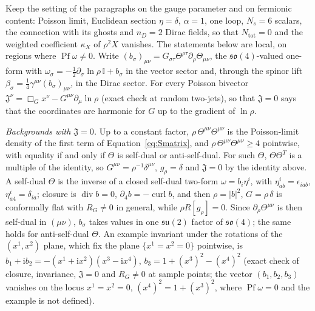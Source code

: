 Keep the setting of the paragraphs on the gauge parameter and on fermionic content: Poisson limit, Euclidean section \(\eta=\delta\), \(\alpha=1\), one loop, \(N_s=6\) scalars, the connection with its ghosts and \(n_D=2\) Dirac fields, so that \(N_{\mathrm{tot}}=0\) and the weighted coefficient \(\kappa_X\) of \(\rho^2X\) vanishes. The statements below are local, on regions where \(\operatorname{Pf}\omega\ne0\). Write \((b_\sigma)_{\mu\nu}=G_{\sigma\tau}\Theta^{\rho\tau}\partial_\rho\Theta_{\mu\nu}\), the \(\mathfrak{so}(4)\)-valued one-form with \(\omega_\sigma=-\tfrac12\partial_\sigma\ln\rho\,\mathbb I+b_\sigma\) in the vector sector and, through the spinor lift \(\beta_\sigma=\tfrac14\gamma^{\mu\nu}(b_\sigma)_{\mu\nu}\), in the Dirac sector. For every Poisson bivector \(\mathfrak J^\nu=\Box_Gx^\nu-G^{\mu\nu}\partial_\mu\ln\rho\) (exact check at random two-jets), so that \(\mathfrak J=0\) says that the coordinates are harmonic for \(G\) up to the gradient of \(\ln\rho\).



\emph{Backgrounds with \(\mathfrak J=0\).} Up to a constant factor, \(\rho\,\Theta^{\mu\nu}\Theta^{\mu\nu}\) is the Poisson-limit density of the first term of Equation~\eqref{eq:Smatrix}, and \(\rho\,\Theta^{\mu\nu}\Theta^{\mu\nu}\ge4\) pointwise, with equality if and only if \(\Theta\) is self-dual or anti-self-dual. For such \(\Theta\), \(\Theta\Theta^T\) is a multiple of the identity, so \(G^{\mu\nu}=\rho^{-1}\delta^{\mu\nu}\), \(g_\rho=\delta\) and \(\mathfrak J=0\) by the identity above. A self-dual \(\Theta\) is the inverse of a closed self-dual two-form \(\omega=b_i\eta^i\), with \(\eta^i_{ab}=\epsilon_{iab}\), \(\eta^i_{a4}=\delta_{ia}\); closure is \(\operatorname{div}b=0\), \(\partial_4b=-\operatorname{curl}b\), and then \(\rho=|b|^2\), \(G=\rho\,\delta\) is conformally flat with \(R_G\ne0\) in general, while \(\rho R[g_\rho]=0\). Since \(\partial_\rho\Theta^{\mu\nu}\) is then self-dual in \((\mu\nu)\), \(b_\sigma\) takes values in one \(\mathfrak{su}(2)\) factor of \(\mathfrak{so}(4)\); the same holds for anti-self-dual \(\Theta\). An example invariant under the rotations of the \((x^1,x^2)\) plane, which fix the plane \(\{x^1=x^2=0\}\) pointwise, is \(b_1+\mathrm ib_2=-(x^1+\mathrm ix^2)(x^3-\mathrm ix^4)\), \(b_3=1+(x^3)^2-(x^4)^2\) (exact check of closure, invariance, \(\mathfrak J=0\) and \(R_G\ne0\) at sample points; the vector \((b_1,b_2,b_3)\) vanishes on the locus \(x^1=x^2=0\), \((x^4)^2=1+(x^3)^2\), where \(\operatorname{Pf}\omega=0\) and the example is not defined).



